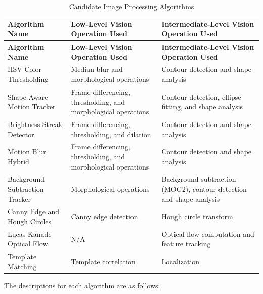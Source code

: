 \documentclass[12pt,a4paper]{article}
\begin{document}
\begin{longtable}{@{} p{} p{} p{} @{}}
\caption{Candidate Image Processing Algorithms}
\label{tab:candidate_algorithms} \\
    \toprule
    \textbf{Algorithm Name} & \textbf{Low-Level Vision Operation Used} & \textbf{Intermediate-Level Vision Operation Used} \\
    \midrule
    \endfirsthead
    \toprule
    \textbf{Algorithm Name} & \textbf{Low-Level Vision Operation Used} & \textbf{Intermediate-Level Vision Operation Used} \\
    \midrule
    \endhead
    \bottomrule
    \endfoot
    \bottomrule
    \endlastfoot
    HSV Color Thresholding & Median blur and morphological operations & Contour detection and shape analysis \\
    
    Shape-Aware Motion Tracker & Frame differencing, thresholding, and morphological operations & Contour detection, ellipse fitting, and shape analysis \\
    
    Brightness Streak Detector & Frame differencing, thresholding, and dilation & Contour detection and shape analysis \\
    
    Motion Blur Hybrid & Frame differencing, thresholding, and morphological operations & Contour detection and shape analysis \\
    
    Background Subtraction Tracker & Morphological operations & Background subtraction (MOG2), contour detection and shape analysis \\
    
    Canny Edge and Hough Circles & Canny edge detection & Hough circle transform \\
    
    Lucas-Kanade Optical Flow & N/A & Optical flow computation and feature tracking \\
    
    Template Matching & Template correlation & Localization \\
\end{longtable}

The descriptions for each algorithm are as follows:
\end{document}
